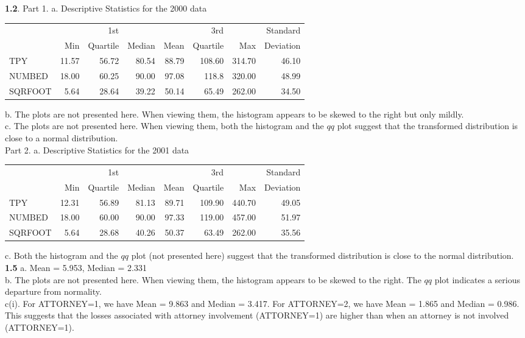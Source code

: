 \textbf{1.2}. Part 1. a. Descriptive Statistics for the 2000 data\\
\begin{center}\begin{tabular}{lrrrrrrr}
   \hline
         &   & 1st  &   &    & 3rd  &   & Standard \\
         & Min  & Quartile  & Median & Mean  & Quartile & Max   & Deviation
         \\\hline
   TPY   & 11.57 & 56.72 & 80.54 & 88.79 & 108.60 & 314.70 & 46.10 \\
   NUMBED & 18.00    & 60.25 & 90.00    & 97.08 & 118.8 & 320.00   & 48.99 \\
   SQRFOOT & 5.64  & 28.64 & 39.22 & 50.14 & 65.49 & 262.00   & 34.50 \\
    \hline
   \end{tabular}\end{center}
b. The plots are not presented here. When viewing them, the
histogram appears to be skewed to the right but only mildly.\\
c. The plots are not presented here. When viewing them, both the
histogram and the $qq$ plot suggest that the transformed
distribution is close to a normal distribution.\\
Part 2. a. Descriptive Statistics for the 2001 data\\
\begin{center}\begin{tabular}{lrrrrrrr}
   \hline
         &   & 1st  &   &    & 3rd  &   & Standard \\
         & Min  & Quartile  & Median & Mean  & Quartile & Max   & Deviation
         \\\hline
   TPY   & 12.31 & 56.89 & 81.13 & 89.71 & 109.90 & 440.70 & 49.05 \\
   NUMBED & 18.00    & 60.00    & 90.00    & 97.33 & 119.00   & 457.00   & 51.97 \\
   SQRFOOT & 5.64  & 28.68 & 40.26 & 50.37 & 63.49 & 262.00   & 35.56 \\
   \hline
   \end{tabular}\end{center}
c. Both the histogram and the $qq$ plot (not presented here) suggest
that the transformed distribution is close to the normal
distribution.\\

\textbf{1.5}
a. Mean = 5.953, Median = 2.331\\
b. The plots are not presented here. When viewing them, the
histogram appears to be skewed to the right. The $qq$ plot indicates
a serious departure from normality.\\
c(i). For ATTORNEY=1, we have Mean = 9.863 and Median = 3.417. For
ATTORNEY=2, we have Mean = 1.865 and Median = 0.986. This suggests
that the losses
associated with attorney involvement (ATTORNEY=1) are higher than when an attorney is not involved (ATTORNEY=1).\\

